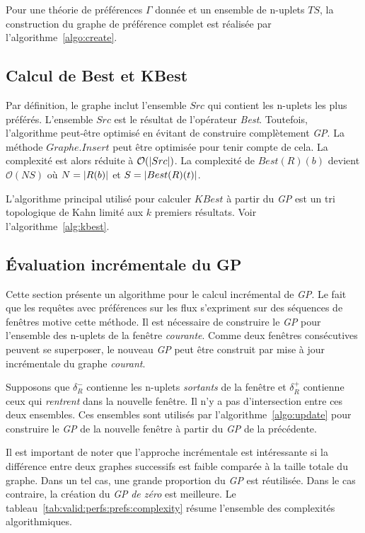 Pour une théorie de préférences $\Gamma$ donnée et un ensemble de n-uplets $TS$, la construction du graphe de préférence complet est réalisée par l'algorithme~\ref{algo:create}.

\subsection{Calcul de Best et KBest}
Par définition, le graphe inclut l'ensemble $Src$ qui contient les n-uplets les plus préférés. L'ensemble $Src$ est le résultat de l'opérateur \textit{Best}. Toutefois, l'algorithme peut-être optimisé en évitant de construire complètement \textit{GP}. La méthode $Graphe.Insert$ peut être optimisée pour tenir compte de cela. 
La complexité est alors réduite à $\mathcal O(\left| Src \right|)$. La complexité de $Best(R)(b)$ devient $\mathcal O(NS)$ où $N = \left| R(b) \right|$ et $S=\left| Best(R)(t) \right|$.

L'algorithme principal utilisé pour calculer $KBest$ à partir du \textit{GP} est un tri topologique de Kahn limité aux $k$ premiers résultats. Voir l'algorithme~\ref{alg:kbest}.

\subsection{Évaluation incrémentale du GP}
Cette section présente un algorithme pour le calcul incrémental de \textit{GP}. Le fait que les requêtes avec préférences sur les flux s'expriment sur des séquences de fenêtres motive cette méthode. Il est nécessaire de construire le \textit{GP} pour l'ensemble des n-uplets de la fenêtre \textit{courante}. Comme deux fenêtres consécutives peuvent se superposer, le nouveau \textit{GP} peut être construit par mise à jour incrémentale du graphe \textit{courant}. 

Supposons que $\delta_R^{-}$ contienne les n-uplets \textit{sortants} de la fenêtre et $\delta_R^{+}$ contienne ceux qui \textit{rentrent} dans la nouvelle fenêtre. Il n'y a pas d'intersection entre ces deux ensembles. Ces ensembles sont utilisés par l'algorithme~\ref{algo:update} pour construire le \textit{GP} de la nouvelle fenêtre à partir du \textit{GP} de la précédente. 

Il est important de noter que l'approche incrémentale est intéressante si la différence entre deux graphes successifs est faible comparée à la taille totale du graphe. Dans un tel cas, une grande proportion du \textit{GP} est réutilisée. Dans le cas contraire, la création du \textit{GP} \textit{de zéro} est meilleure. Le tableau~\ref{tab:valid:perfs:prefs:complexity} résume l'ensemble des complexités algorithmiques.

